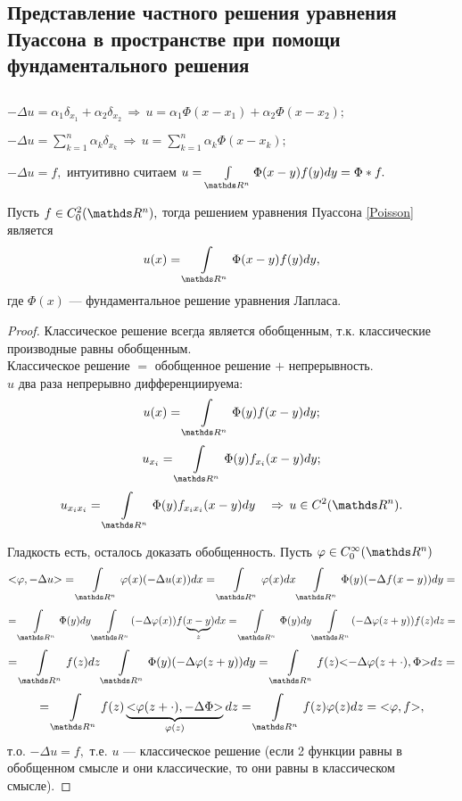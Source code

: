 \subsection{Представление частного решения уравнения Пуассона в пространстве при помощи фундаментального решения}
$ $

$-\Delta u = \alpha_1\delta_{x_1} + \alpha_2\delta_{x_2} \, \Rightarrow \, u = \alpha_1\Phi(x-x_1) + \alpha_2\Phi(x-x_2);$

$-\Delta u = \sum\limits_{k=1}^n\alpha_k\delta_{x_k}\,\Rightarrow\, u = \sum\limits_{k=1}^n\alpha_k\Phi(x-x_k);$

$-\Delta u = f,$ интуитивно считаем $u = \int\limits_{\real^n}\Phi(x-y)f(y)dy = \Phi*f.$

\begin{theorem}
Пусть $f\in C_0^2(\real^n),$ тогда решением уравнения Пуассона \eqref{Poisson} является
$$ u(x) = \int\limits_{\real^n} \Phi(x-y)f(y)dy,$$ где $\Phi(x)$ --- фундаментальное решение уравнения Лапласа.
\end{theorem}
\begin{proof}
Классическое решение всегда является обобщенным, т.к. классические производные равны обобщенным.\\ Классическое решение $=$ обобщенное решение $+$ непрерывность.\\
$u$ два раза непрерывно дифференциируема:
$$u(x) = \int\limits_{\real^n}\Phi(y)f(x-y)dy;$$
$$u_{x_i}=\int\limits_{\real^n}\Phi(y)f_{x_i}(x-y)dy;$$
$$u_{x_ix_i}=\int\limits_{\real^n}\Phi(y)f_{x_ix_i}(x-y)dy
\quad \Rightarrow \, u\in C^2(\real^n).$$

Гладкость есть, осталось доказать обобщенность. Пусть $\varphi\in C_0^\infty(\real^n)$
$$\action{\varphi, -\Delta u} = \int\limits_{\real^n} \varphi(x)(-\Delta u(x))dx = \int\limits_{\real^n}\varphi(x)dx\int\limits_{\real^n}\Phi(y)(-\Delta f(x-y))dy=$$
$$=\int\limits_{\real^n}\Phi(y)dy\int\limits_{\real^n}(-\Delta\varphi(x))f(\underbrace{x-y}_z)dx = \int\limits_{\real^n}\Phi(y)dy\int\limits_{\real^n}(-\Delta\varphi(z+y))f(z)dz = $$
$$=\int\limits_{\real^n}f(z)dz\int\limits_{\real^n}\Phi(y)(-\Delta\varphi(z+y))dy = \int\limits_{\real^n}f(z)\action{-\Delta\varphi(z+\cdot), \Phi}dz = $$
$$= \int\limits_{\real^n}f(z)\underbrace{\action{\varphi(z+\cdot), -\Delta\Phi}}_{\varphi(z)}dz = \int\limits_{\real^n}f(z)\varphi(z)dz = \action{\varphi, f},$$
т.о. $-\Delta u = f,$ т.е. $u$ --- классическое решение (если 2 функции равны в обобщенном смысле и они классические, то они равны в классическом смысле).
\end{proof}
